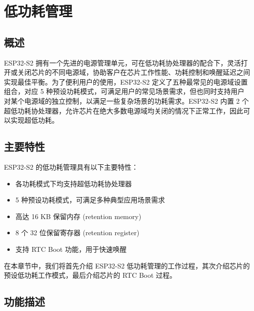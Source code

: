 \documentclass[main\_\_CN.tex]{subfiles}
\begin{document}
\setchineseformatting

\ifglobal
\else
    \listoftodos
    {\let\clearpage\relax \listofdonetodos}
    \tableofcontents
\fi




\hypertarget{lowpowm}{}
\chapter{低功耗管理}
\label{mod:lowpowm}

\section{概述}

ESP32-S2 拥有一个先进的电源管理单元，可在低功耗协处理器的配合下，灵活打开或关闭芯片的不同电源域，协助客户在芯片工作性能、功耗控制和唤醒延迟之间实现最佳平衡。为了便利用户的使用，ESP32-S2 定义了五种最常见的电源域设置组合，对应 5 种预设功耗模式，可满足用户的常见场景需求，但也同时支持用户对某个电源域的独立控制，以满足一些复杂场景的功耗需求。ESP32-S2 内置 2 个超低功耗协处理器，允许芯片在绝大多数电源域均关闭的情况下正常工作，因此可以实现超低功耗。

\section{主要特性}
ESP32-S2 的低功耗管理具有以下主要特性：
\begin{itemize}
\item 各功耗模式下均支持超低功耗协处理器
\item 5 种预设功耗模式，可满足多种典型应用场景需求
\item 高达 16 KB 保留内存 (retention memory)
\item 8 个 32 位保留寄存器 (retention register)
\item 支持 RTC Boot 功能，用于快速唤醒
\end{itemize}

在本章节中，我们将首先介绍 ESP32-S2 低功耗管理的工作过程，其次介绍芯片的预设低功耗工作模式，最后介绍芯片的 RTC Boot 过程。

\section{功能描述}
\end{document}
